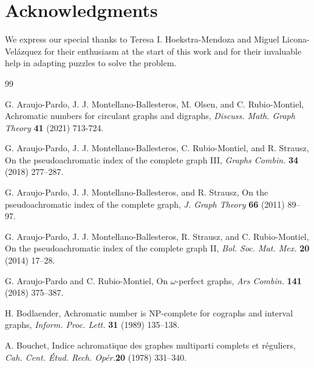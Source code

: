 \documentclass{article}
\newcommand{\blue}[1]{\textcolor{blue}{#1}}
\newcommand{\red}[1]{\textcolor{red}{#1}}
\begin{document}
\section{Acknowledgments} 
We express our special thanks to Teresa I. Hoekstra-Mendoza and Miguel Licona-Velázquez for their enthusiasm at the start of this work and for their invaluable help in adapting puzzles to solve the problem.


\begin{thebibliography}{99}

G. Araujo-Pardo, J. J. Montellano-Ballesteros, M. Olsen, and C. Rubio-Montiel, 
Achromatic numbers for circulant graphs and digraphs, 
\textit{Discuss. Math. Graph Theory} \textbf{41} (2021) 713-724.

G. Araujo-Pardo, J. J. Montellano-Ballesteros, C. Rubio-Montiel, and R. Strausz,
On the pseudoachromatic index of the complete graph III,
\textit{Graphs Combin.} \textbf{34} (2018) 277--287.

G. Araujo-Pardo, J. J. Montellano-Ballesteros, and R. Strausz,
On the pseudoachromatic index of the complete graph,
\textit{J. Graph Theory} \textbf{66} (2011) 89--97.

G. Araujo-Pardo, J. J. Montellano-Ballesteros, R. Strausz, and C. Rubio-Montiel,
On the pseudoachromatic index of the complete graph II,
\textit{Bol. Soc. Mat. Mex.} \textbf{20} (2014) 17--28.

G. Araujo-Pardo and C. Rubio-Montiel,
On $\omega$-perfect graphs,
\textit{Ars Combin.} \textbf{141} (2018) 375--387. 


H. Bodlaender,
Achromatic number is NP-complete for cographs and interval graphs,
\textit{Inform. Proc. Lett.} \textbf{31} (1989) 135--138.

A. Bouchet,
Indice achromatique des graphes multiparti complets et réguliers,
\textit{Cah. Cent. Étud. Rech. Opér.}\textbf{20} (1978) 331--340.


\end{thebibliography}
\end{document}
